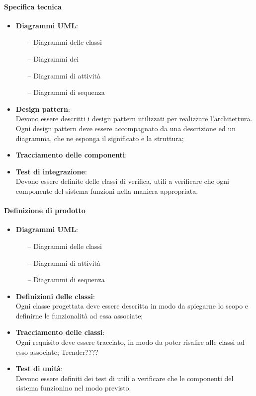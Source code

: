  \paragraph{Specifica tecnica}
\begin{itemize} 
	\item \textbf{Diagrammi UML}:
	\begin{itemize}
	\item[--] Diagrammi delle classi
	\item[--] Diagrammi dei 
	\item[--] Diagrammi di attività
	\item[--] Diagrammi di sequenza
	\end{itemize}
	\item \textbf{Design pattern}:\\	Devono essere descritti i design pattern utilizzati per realizzare l'architettura. Ogni design
pattern deve essere accompagnato da una descrizione ed un diagramma, che ne esponga il
significato e la struttura;
	\item \textbf{Tracciamento delle componenti}:
	\item \textbf{Test di integrazione}:\\	Devono essere definite delle classi di verifica, utili a verificare che ogni componente del
sistema funzioni nella maniera appropriata.
\end{itemize}
 \paragraph{Definizione di prodotto}
\begin{itemize}
	\item \textbf{Diagrammi UML}:
	\begin{itemize}
		\item[--] Diagrammi delle classi
		\item[--] Diagrammi di attività
		\item[--] Diagrammi di sequenza
	\end{itemize}
	\item \textbf{Definizioni delle classi}:\\Ogni classe progettata deve essere descritta in modo da spiegarne lo scopo e definirne le
funzionalità ad essa associate;
	\item \textbf{Tracciamento delle classi}:\\Ogni requisito deve essere tracciato, in modo da poter risalire alle classi ad esso associate; Trender????
	\item \textbf{Test di unità}:\\Devono essere definiti dei test di  utili a verificare che le componenti del sistema
funzionino nel modo previsto.
\end{itemize}

